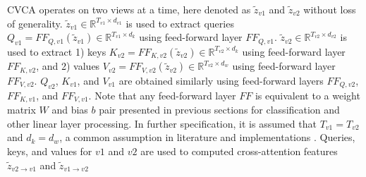 CVCA operates on two views at a time, here denoted as $\tilde{z}_{v1}$ and $\tilde{z}_{v2}$ without loss of generality. $\tilde{z}_{v1} \in \mathbb{R}^{T_{v1} \times d_{v1}}$ is used to extract queries $Q_{v1} = FF_{Q,v1}(\tilde{z}_{v1}) \in \mathbb{R}^{T_{v1} \times d_{k}}$ using feed-forward layer $FF_{Q,v1}$. $\tilde{z}_{v2} \in \mathbb{R}^{T_{v2} \times d_{v2}}$ is used to extract 1) keys $K_{v2} = FF_{K,v2}(\tilde{z}_{v2}) \in \mathbb{R}^{T_{v2} \times d_{k}}$ using feed-forward layer $FF_{K,v2}$, and 2) values $V_{v2} = FF_{V,v2}(\tilde{z}_{v2}) \in \mathbb{R}^{T_{v2} \times d_{w}}$ using feed-forward layer $FF_{V,v2}$. $Q_{v2}$, $K_{v1}$, and $V_{v1}$ are obtained similarly using feed-forward layers $FF_{Q,v2}$, $FF_{K,v1}$, and $FF_{V,v1}$. Note that any feed-forward layer $FF$ is equivalent to a weight matrix $W$ and bias $b$ pair presented in previous sections for classification and other linear layer processing. In further specification, it is assumed that $T_{v1} = T_{v2}$ and $d_{k} = d_{w}$, a common assumption in literature and implementations \cite{dosovitskiy2020image}. Queries, keys, and values for $v1$ and $v2$ are used to computed cross-attention features $\tilde{z}_{v2 \rightarrow v1}$ and $\tilde{z}_{v1 \rightarrow v2}$
